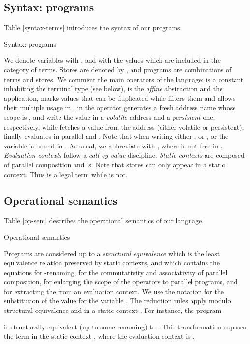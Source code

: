 \documentclass[11pt]{article}
\begin{document}
\subsection{Syntax: programs}
Table \ref{syntax-terms} introduces the syntax of our programs.
\begin{table}
{\footnotesize
}
\caption{Syntax: programs}\label{syntax-terms}
\end{table}
We denote variables with , and  with  the values
which are included in the category  of terms. Stores are denoted by
, and programs  are combinations of terms and stores.  We comment
the main operators of the language:  is a constant inhabiting
the terminal type  (see below),  is the {\em
affine} abstraction and  the application,  marks values that
can be duplicated while  filters them and
allows their multiple usage in , in  the operator 
generates a fresh address name  whose scope is ,  and
 write the value  in a {\em volatile} address and a {\em
persistent} one, respectively, while  fetches a value from
the address  (either volatile or persistent), finally 
evaluates in parallel  and .
Note that when writing either , or , or  the
variable  is bound in . 
As usual, we abbreviate  with , where  is not free in .
{\em Evaluation contexts}  follow a {\em call-by-value} discipline.
{\em Static contexts}  are composed of parallel composition and 's.
Note that stores can only appear in a static context. Thus 
 is a legal term while   is not. 


\subsection{Operational semantics}
Table \ref{op-sem} describes the operational semantics of our language.
\begin{table}
{\footnotesize

}
\caption{Operational semantics} \label{op-sem}
\end{table}
Programs are considered up to a {\em structural equivalence}  which
is the least equivalence relation preserved by  static contexts,
and which contains the equations for  -renaming, 
for the commutativity and associativity  of parallel composition,
for enlarging the scope of the  operators to parallel programs,
and for extracting the  from an evaluation context.
We use the notation  for the substitution of the value 
for the variable .
The reduction rules apply modulo structural equivalence 
and in a static context .
For instance, the program 

is structurally equivalent (up to some renaming) to
. This transformation
exposes the term   in the 
static context , where the
evaluation context  is .
\end{document}
